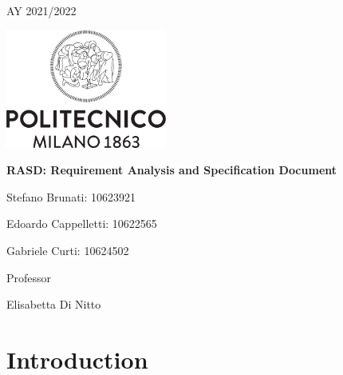 \documentclass{article}
\begin{document}
\begin{titlepage}
    \centering
    {\scshape\large AY 2021/2022 \par}
    \vfill
    \includegraphics[width=150pt]{images/Logo_Politecnico_Milano.png}\par\vspace{1cm}
    \vspace{1.5cm}
    {\huge\bfseries RASD\@: Requirement Analysis and Specification Document \par}
    \vspace{2cm}
    {\Large {Stefano Brunati: 10623921\par}}
    {\Large {Edoardo Cappelletti: 10622565\par}}
    {\Large {Gabriele Curti: 10624502\par}}
    \vfill
    {\large Professor\par Elisabetta Di Nitto}
    \vfill
\end{titlepage}

\newpage

\tableofcontents 

\newpage

\section{Introduction}
\end{document}
